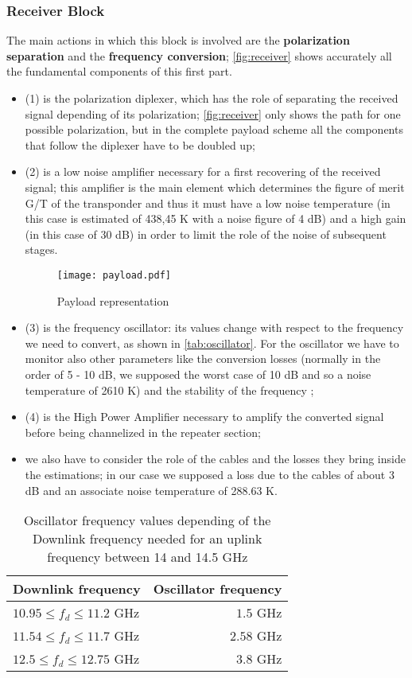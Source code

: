 \subsubsection{Receiver Block}
The main actions in which this block is involved are the \textbf{polarization separation} and the \textbf{frequency conversion}; \autoref{fig:receiver} shows accurately all the fundamental components of this first part.
\begin{itemize}
\item (1) is the polarization diplexer, which has the role of separating the received signal depending of its polarization; \autoref{fig:receiver} only shows the path for one possible polarization, but in the complete payload scheme all the components that follow the diplexer have to be doubled up;
\item (2) is a low noise amplifier necessary for a first recovering of the received signal; this amplifier is the main element which determines the figure of merit G/T of the transponder and thus it must have a low noise temperature (in this case is estimated of 438,45 K with a noise figure of 4 dB) and a high gain (in this case of 30 dB) in order to limit the role of the noise of subsequent stages.
\begin{sidewaysfigure}
\centering
\texttt{[image: payload.pdf]}
\caption{Payload representation}
\label{fig:payload}
\end{sidewaysfigure}
\item (3) is the frequency oscillator: its values change with respect to the frequency we need to convert, as shown in \autoref{tab:oscillator}. For the oscillator we have to monitor also other parameters like the conversion losses (normally in the order of 5 - 10 dB, we supposed the worst case of 10 dB and so a noise temperature of 2610 K) and the stability of the frequency \cite{Maral2017};
\item (4) is the High Power Amplifier necessary to amplify the converted signal before being channelized in the repeater section;
\item we also have to consider the role of the cables and the losses they bring inside the estimations; in our case we supposed a loss due to the cables of about 3 dB and an associate noise temperature of 288.63 K.
\end{itemize}
	\begin{table}
	\centering
	\begin{tabular}{lr}
	\toprule
	Downlink frequency & Oscillator frequency\\
	\midrule
	$10.95 \leq f_d \leq 11.2$ GHz & $1.5$ GHz\\
	$11.54 \leq f_d \leq 11.7$ GHz & $2.58$ GHz\\
	$12.5 \leq f_d \leq 12.75$ GHz & $3.8$ GHz\\
	\bottomrule
	\end{tabular}
	\caption{Oscillator frequency values depending of the Downlink frequency needed for an uplink frequency between 14 and 14.5 GHz}
	\label{tab:oscillator}
\end{table}
